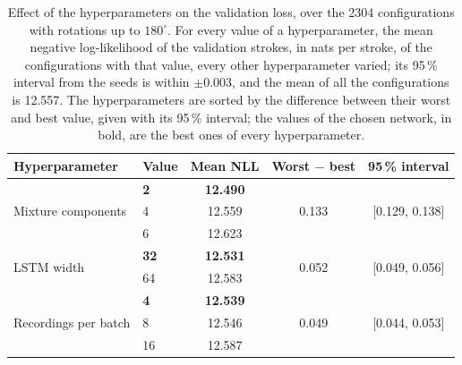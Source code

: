\documentclass[12pt]{report}
\begin{document}
\begin{table}[htbp]
    \centering
    \caption{Effect of the hyperparameters on the validation loss, over the 2304 configurations with rotations up to $180^\circ$. For every value of a hyperparameter, the mean negative log-likelihood of the validation strokes, in nats per stroke, of the configurations with that value, every other hyperparameter varied; its 95\,\% interval from the seeds is within $\pm0.003$, and the mean of all the configurations is 12.557. The hyperparameters are sorted by the difference between their worst and best value, given with its 95\,\% interval; the values of the chosen network, in bold, are the best ones of every hyperparameter.}
    \label{tab:hyperparameter_effects}
    \begin{tabular}{llccc}
        \toprule
        Hyperparameter & Value & Mean NLL & Worst $-$ best & 95\,\% interval \\
        \midrule
        \multirow{3}{*}{Mixture components}       & \textbf{2}                         & \textbf{12.490} & \multirow{3}{*}{0.133} & \multirow{3}{*}{[0.129, 0.138]} \\
                                                  & 4                                  & 12.559          &                        &                                 \\
                                                  & 6                                  & 12.623          &                        &                                 \\
        \midrule
        \multirow{2}{*}{LSTM width}               & \textbf{32}                        & \textbf{12.531} & \multirow{2}{*}{0.052} & \multirow{2}{*}{[0.049, 0.056]} \\
                                                  & 64                                 & 12.583          &                        &                                 \\
        \midrule
        \multirow{3}{*}{Recordings per batch}     & \textbf{4}                         & \textbf{12.539} & \multirow{3}{*}{0.049} & \multirow{3}{*}{[0.044, 0.053]} \\
                                                  & 8                                  & 12.546          &                        &                                 \\
                                                  & 16                                 & 12.587          &                        &                                 \\

\end{tabular}
\end{table}
\end{document}
